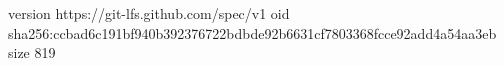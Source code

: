 version https://git-lfs.github.com/spec/v1
oid sha256:ccbad6c191bf940b392376722bdbde92b6631cf7803368fcce92add4a54aa3eb
size 819
